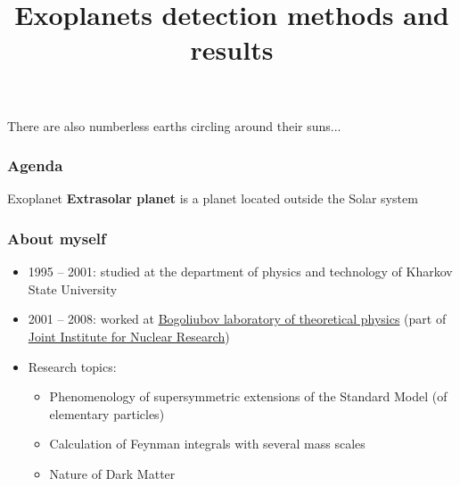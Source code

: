 \documentclass[aspectratio=169]{beamer}
\title[Exoplanets detection methods and results]{Exoplanets detection methods and results}
\author{}
\date{}
\begin{document}
{
\begin{frame}[plain]
\vspace{-5.7cm}
\small{
\centerline{There are also numberless earths circling around their suns...}
}
\end{frame}
}

\begin{frame}
\frametitle{Agenda}
\begin{block}{Exoplanet}
{\bf Extrasolar planet} is a planet located outside the Solar system
\end{block}
\tableofcontents
\end{frame}

\begin{frame}
\frametitle{About myself}
\begin{itemize}
\item 1995 -- 2001: studied at the department of physics and technology of Kharkov State University
\item 2001 -- 2008: worked at \href{http://theor.jinr.ru}{Bogoliubov laboratory of theoretical physics}
	(part of \href{http://www.jinr.ru}{Joint Institute for Nuclear Research})
\item Research topics:
      \begin{itemize}
      \item Phenomenology of supersymmetric extensions of the Standard Model (of elementary particles)
      \item Calculation of Feynman integrals with several mass scales
      \item Nature of Dark Matter
      \end{itemize}
\end{itemize}
\end{frame}
\end{document}
